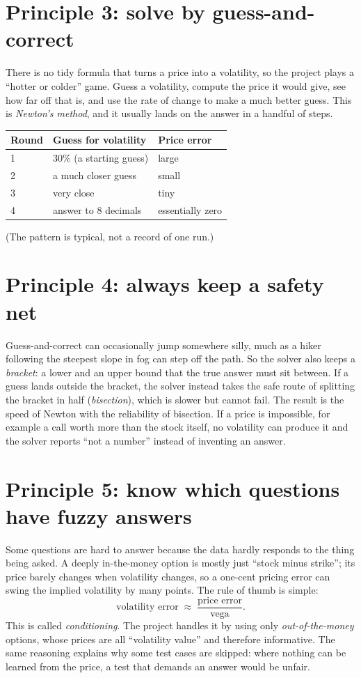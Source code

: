 \documentclass[11pt]{article}
\begin{document}
\section{Principle 3: solve by guess-and-correct}
There is no tidy formula that turns a price into a volatility, so the project plays a ``hotter or colder'' game. Guess a volatility, compute the price it would give, see how far off that is, and use the rate of change to make a much better guess. This is \emph{Newton's method}, and it usually lands on the answer in a handful of steps.

\begin{center}
\begin{tabular}{@{}lll@{}}
\toprule
\textbf{Round} & \textbf{Guess for volatility} & \textbf{Price error}\\\midrule
1 & 30\% (a starting guess) & large\\
2 & a much closer guess & small\\
3 & very close & tiny\\
4 & answer to 8 decimals & essentially zero\\\bottomrule
\end{tabular}
\end{center}
(The pattern is typical, not a record of one run.)

\section{Principle 4: always keep a safety net}
Guess-and-correct can occasionally jump somewhere silly, much as a hiker following the steepest slope in fog can step off the path. So the solver also keeps a \emph{bracket}: a lower and an upper bound that the true answer must sit between. If a guess lands outside the bracket, the solver instead takes the safe route of splitting the bracket in half (\emph{bisection}), which is slower but cannot fail. The result is the speed of Newton with the reliability of bisection. If a price is impossible, for example a call worth more than the stock itself, no volatility can produce it and the solver reports ``not a number'' instead of inventing an answer.

\section{Principle 5: know which questions have fuzzy answers}
Some questions are hard to answer because the data hardly responds to the thing being asked. A deeply in-the-money option is mostly just ``stock minus strike''; its price barely changes when volatility changes, so a one-cent pricing error can swing the implied volatility by many points. The rule of thumb is simple:
\[
\text{volatility error} \;\approx\; \frac{\text{price error}}{\text{vega}}.
\]
This is called \emph{conditioning}. The project handles it by using only \emph{out-of-the-money} options, whose prices are all ``volatility value'' and therefore informative. The same reasoning explains why some test cases are skipped: where nothing can be learned from the price, a test that demands an answer would be unfair.
\end{document}
